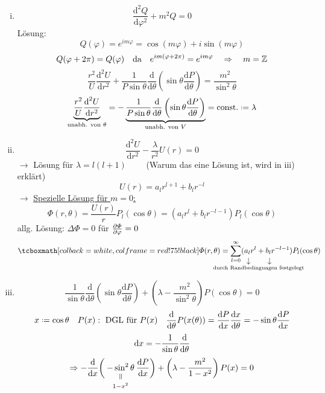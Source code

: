 \begin{enumerate}[i)]
	\item $$\frac{\textrm{d}^2 Q}{\textrm{d} \varphi^2} + m^2 Q = 0$$ Lösung: $$Q(\varphi) = e^{im\varphi} = \cos(m\varphi) + i\sin(m\varphi)$$
	 	$$Q(\varphi + 2 \pi) = Q(\varphi) \quad \textrm{da} \quad e^{im(\varphi + 2\pi)} = e^{im\varphi} \quad \Rightarrow \quad m = \mathbb Z$$
	 	$$\frac{r^2}{U} \frac{\textrm{d}^2 U}{\textrm{d} r^2} + \frac{1}{P\sin\theta} \frac{\textrm{d}}{\textrm{d} \theta}\left( \sin\theta \frac{\textrm{d}P}{\textrm{d}\theta} \right) = \frac{m^2}{\sin^2\theta}$$
	 	$$\ub{\frac{r^2}{U} \frac{\textrm{d}^2 U}{\textrm{d} r^2}}_{\tx{unabh. von } \theta } = - \ub{\frac{1}{P\sin\theta}\frac{\textrm{d}}{\textrm{d} \theta}\left( \sin\theta \frac{\textrm{d}P}{\textrm{d}\theta} \right)}_{\tx{unabh. von } V} = \const \defeq \lambda$$
	 \item $$\frac{\textrm{d}^2 U}{\textrm{d} r^2} - \frac{\lambda}{r^2} U(r) = 0$$
	 	$\rightarrow$ Lösung für $\lambda = l(l + 1) \qquad$ (Warum das eine Lösung ist, wird  in iii) erklärt)
	 	$$U(r) = a_l r^{l + 1} + b_l r^{-l}$$
	 	$\rightarrow$ \underline{Spezielle Lösung für $m = 0$:}
	 	$$\Phi(r,\theta) = \frac{U(r)}{r}P_l (\cos\theta) = (a_l r^l + b_l r^{-l - 1}) P_l (\cos\theta)$$
	 	allg. Lösung: $\Delta\Phi = 0$ für $\frac{\partial \varPhi}{\partial \varphi} = 0$
	 	$$\rmbox{ \Phi(r,\theta) = \summ{l = 0}{\infty} (\custo{\to}{a_l}{\mathclap{\hspace{30pt}\textrm{durch Randbedingungen festgelegt}}} r^l + \custo{\to}{b_l}{} r^{-l - 1}) P_l(\cos\theta)}$$
	 \item $$\frac{1}{\sin\theta} \frac{\textrm{d}}{\textrm{d} \theta}\left( \sin\theta \frac{\textrm{d}P}{\textrm{d}\theta}\right) + \left(\lambda - \frac{m^2}{\sin^2\theta}\right)P(\cos\theta) = 0$$
	 	$$x \defeq \cos\theta \quad P(x): \textrm{ DGL für } P(x) \quad \frac{\textrm{d}}{\textrm{d} \theta} P(x(\theta)) = \frac{\textrm{d}P}{\textrm{d}x} \frac{\textrm{d}x}{\textrm{d}\theta} = -\sin \theta \frac{\textrm{d}P}{\textrm{d}x}$$
	 	\begin{equation*}
	 	\textrm{d} x = - \frac{1}{\sin\theta} \frac{\textrm{d} }{\textrm{d} \theta}
	 	\end{equation*}
	 	$$\Rightarrow - \frac{\textrm{d}}{\textrm{d}x} \bigg( \equalto{ - \sin^2\theta}{1 - x^2} \frac{\textrm{d}P}{\textrm{d}x} \bigg) + \left(\lambda - \frac{m^2}{1-x^2}\right) P(x) = 0$$
\end{enumerate}
